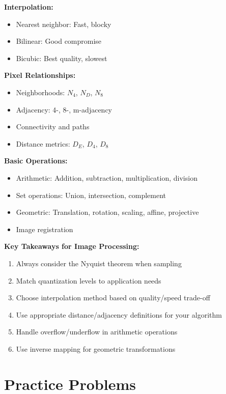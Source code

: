 \documentclass[12pt,a4paper]{article}
\begin{document}
\begin{conceptbox}
\textbf{Interpolation:}
\begin{itemize}
    \item Nearest neighbor: Fast, blocky
    \item Bilinear: Good compromise
    \item Bicubic: Best quality, slowest
\end{itemize}

\textbf{Pixel Relationships:}
\begin{itemize}
    \item Neighborhoods: $N_4$, $N_D$, $N_8$
    \item Adjacency: 4-, 8-, m-adjacency
    \item Connectivity and paths
    \item Distance metrics: $D_E$, $D_4$, $D_8$
\end{itemize}

\textbf{Basic Operations:}
\begin{itemize}
    \item Arithmetic: Addition, subtraction, multiplication, division
    \item Set operations: Union, intersection, complement
    \item Geometric: Translation, rotation, scaling, affine, projective
    \item Image registration
\end{itemize}
\end{conceptbox}

\begin{importantbox}
\textbf{Key Takeaways for Image Processing:}
\begin{enumerate}
    \item Always consider the Nyquist theorem when sampling
    \item Match quantization levels to application needs
    \item Choose interpolation method based on quality/speed trade-off
    \item Use appropriate distance/adjacency definitions for your algorithm
    \item Handle overflow/underflow in arithmetic operations
    \item Use inverse mapping for geometric transformations
\end{enumerate}
\end{importantbox}

\section{Practice Problems}
\end{document}
